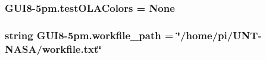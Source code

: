\subsubsection[{\texorpdfstring{test\+O\+L\+A\+Colors}{testOLAColors}}]{\setlength{\rightskip}{0pt plus 5cm}G\+U\+I8-\/5pm.\+test\+O\+L\+A\+Colors = None}\hypertarget{namespaceGUI8-5pm_ab68e1f0d94f4a00210276fed699faaf7}{}\label{namespaceGUI8-5pm_ab68e1f0d94f4a00210276fed699faaf7}
\subsubsection[{\texorpdfstring{workfile\+\_\+path}{workfile_path}}]{\setlength{\rightskip}{0pt plus 5cm}string G\+U\+I8-\/5pm.\+workfile\+\_\+path = \char`\"{}/home/pi/U\+NT-\/N\+A\+SA/workfile.\+txt\char`\"{}}\hypertarget{namespaceGUI8-5pm_a508b4e6132ee7dc30a64d3138ca931f1}{}\label{namespaceGUI8-5pm_a508b4e6132ee7dc30a64d3138ca931f1}
